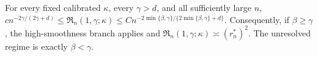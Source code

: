 For every fixed calibrated \(\kappa\), every \(\gamma>d\), and all sufficiently large \(n\), \(c n^{-2\gamma/(2\gamma+d)}\le\mathfrak R_n(1,\gamma;\kappa)\le C n^{-2\min\{\beta,\gamma\}/\{2\min\{\beta,\gamma\}+d\}}\). Consequently, if \(\beta\ge\gamma\), the high-smoothness branch applies and \(\mathfrak R_n(1,\gamma;\kappa)\asymp(r_n^*)^2\). The unresolved regime is exactly \(\beta<\gamma\).